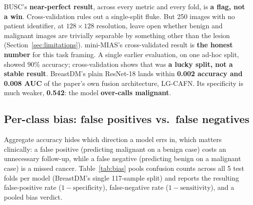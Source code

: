 \documentclass[11pt]{article}
\begin{document}
BUSC's \textbf{near-perfect result}, across every metric and every fold, is
\textbf{a flag, not a win}. Cross-validation rules out a single-split
fluke. But 250 images with no patient identifier, at $128\times128$
resolution, leave open whether benign and malignant images are trivially
separable by something other than the lesion (Section~\ref{sec:limitations}).
mini-MIAS's cross-validated result is \textbf{the honest number} for this
task framing. A single earlier evaluation, on one ad-hoc split, showed
90\% accuracy; cross-validation shows that was \textbf{a lucky split, not a
stable result}. BreastDM's plain ResNet-18 lands within \textbf{0.002
accuracy and 0.008 AUC} of the paper's own fusion architecture, LG-CAFN.
Its specificity is much weaker, \textbf{0.542}: the model
\textbf{over-calls malignant}.

\subsection{Per-class bias: false positives vs.\ false negatives}
\label{sec:bias}

Aggregate accuracy hides which direction a model errs in, which matters
clinically: a false positive (predicting malignant on a benign case) costs
an unnecessary follow-up, while a false negative (predicting benign on a
malignant case) is a missed cancer. Table~\ref{tab:bias} pools confusion
counts across all 5 test folds per model (BreastDM's single 117-sample
split) and reports the resulting false-positive rate ($1-\text{specificity}$),
false-negative rate ($1-\text{sensitivity}$), and a pooled bias verdict.
\end{document}
